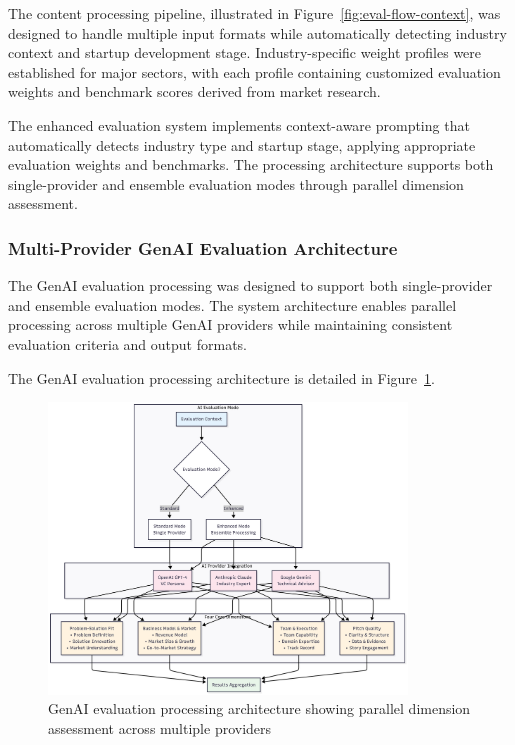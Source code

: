 The content processing pipeline, illustrated in Figure~\ref{fig:eval-flow-context}, was designed to handle multiple input formats while automatically detecting industry context and startup development stage. Industry-specific weight profiles were established for major sectors, with each profile containing customized evaluation weights and benchmark scores derived from market research.

The enhanced evaluation system implements context-aware prompting that automatically detects industry type and startup stage, applying appropriate evaluation weights and benchmarks. The processing architecture supports both single-provider and ensemble evaluation modes through parallel dimension assessment.

\subsubsection{Multi-Provider GenAI Evaluation Architecture}
The GenAI evaluation processing was designed to support both single-provider and ensemble evaluation modes. The system architecture enables parallel processing across multiple GenAI providers while maintaining consistent evaluation criteria and output formats.

The GenAI evaluation processing architecture is detailed in Figure~\ref{fig:eval-flow-ai}.

\begin{figure}[H]
  \centering
  \includegraphics[width=0.85\textwidth]{img/eval-flow-ai}
  \caption{GenAI evaluation processing architecture showing parallel dimension assessment across multiple providers}
  \label{fig:eval-flow-ai}
\end{figure}


